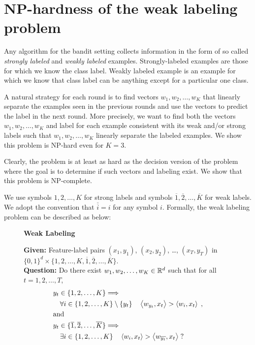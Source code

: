 \section{NP-hardness of the weak labeling problem}
\label{section:np-hardness-of-weak-labeling-problem}

Any algorithm for the bandit setting collects information in the form of so
called \emph{strongly labeled} and \emph{weakly labeled} examples.
Strongly-labeled examples are those for which we know the class label. Weakly
labeled example is an example for which we know that class label can be anything
except for a particular one class.

A natural strategy for each round is to find vectors $w_1, w_2, \dots, w_K$ that
linearly separate the examples seen in the previous rounds and use the vectors
to predict the label in the next round. More precisely, we want to find both the
vectors $w_1, w_2, \dots, w_K$ and label for each example consistent with its
weak and/or strong labels such that $w_1, w_2, \dots, w_K$ linearly separate the
labeled examples. We show this problem is NP-hard even for $K=3$.

Clearly, the problem is at least as hard as the decision version of the problem
where the goal is to determine if such vectors and labeling exist. We show that
this problem is NP-complete.

We use symbols $1,2,\dots,K$ for strong labels and symbols $\overline{1},
\overline{2}, \dots, \overline{K}$ for weak labels. We adopt the convention that
$\overline{\overline{i}} = i$ for any symbol $i$. Formally, the weak
labeling problem can be described as below:
\begin{figure}[H]
\begin{framed}
\begin{center}
    \textbf{Weak Labeling}
\end{center}
\textbf{Given:} Feature-label pairs $(x_1, y_1)$, $(x_2, y_2)$, \dots, $(x_T, y_T)$ in $\{0,1\}^d \times \{1,2,\dots, K, \overline{1}, \overline{2}, \dots, \overline{K}\}$. \\
\textbf{Question:} Do there exist $ w_1, w_2, \dots, w_K \in \mathbb{R}^d$ such that for all $t=1,2,\dots,T$,
\begin{align*}
& y_t \in \{1,2,\dots,K\} \Longrightarrow  \\
& \quad \forall i \in \{1,2,\dots,K\} \setminus \{y_t\} \quad \left\langle w_{y_t}, x_t \right\rangle  > \left\langle w_i, x_t \right\rangle \; , \\
& \text{and} \\
& y_t \in \{\overline{1}, \overline{2},\dots, \overline{K}\} \Longrightarrow \\
& \quad \exists i \in \{1,2,\dots,K\} \quad \left\langle w_i, x_t \right\rangle > \left\langle w_{\overline{y_t}}, x_t \right\rangle \; ?
\end{align*}
\end{framed}
\end{figure}

